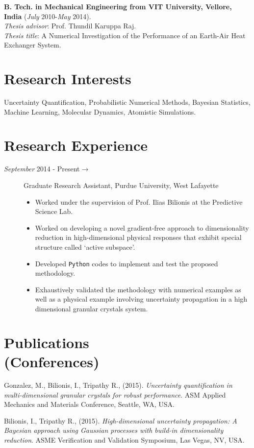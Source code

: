 \documentclass[margin,line,a4paper]{resume}
\begin{document}
\begin{resume}
    \textbf{B. Tech. in Mechanical Engineering from VIT University, Vellore, India}
    (\textit{July} 2010-\textit{May} 2014). \\
    \textit{Thesis advisor}: Prof. Thundil Karuppa Raj. \\
    \textit{Thesis title}: A Numerical Investigation of the Performance of an Earth-Air Heat Exchanger System.




\section{\mysidestyle Research Interests}
Uncertainty Quantification, Probabilistic Numerical Methods, Bayesian Statistics, Machine Learning, Molecular Dynamics, Atomistic Simulations.




\section{\mysidestyle Research Experience}
\begin{description}
\item[\textit{September} 2014 - Present$\rightarrow$] Graduate Research Assistant, Purdue University, West Lafayette
\begin{itemize}
\item Worked under the supervision of Prof. Ilias Bilionis at the Predictive Science Lab.
\item Worked on developing a novel gradient-free approach to dimensionality reduction in high-dimensional physical responses that exhibit special structure called `active subspace'.
\item Developed \texttt{Python} codes to implement and test the proposed methodology.
\item Exhaustively validated the methodology with numerical examples as well as a physical example involving uncertainty propagation in a high dimensional granular crystals system.
\end{itemize}
\end{description}




\section{\mysidestyle Publications \\ (Conferences)}
\begin{description}
\item Gonzalez, M., Bilionis, I., Tripathy R., (2015). \textit{Uncertainty quantification in multi-dimensional granular crystals for robust performance}. ASM Applied Mechanics and Materials Conference, Seattle, WA, USA.
\item Bilionis, I., Tripathy R., (2015). \textit{High-dimensional uncertainty propagation: A Bayesian approach using Gaussian processes with build-in dimensionality reduction}. ASME Verification and Validation Symposium, Las Vegas, NV, USA.
\end{description}




\end{resume}
\end{document}
